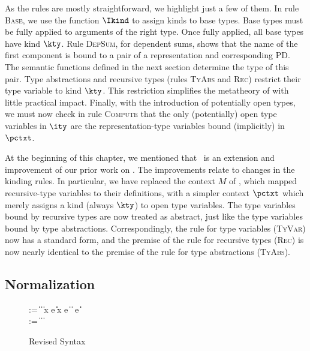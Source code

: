 As the rules are mostly straightforward, we highlight just a few of
them. In rule \textsc{Base}, we use the function $\Ikind$ to assign
kinds to base types.  Base types must be fully applied to arguments of
the right type.  Once fully applied, all base types have kind $\kty$.
Rule \textsc{DepSum}, for dependent sums, shows that the name of the first component is
bound to a pair of a representation and corresponding PD.  The
semantic functions defined in the next section determine the type of
this pair. Type abstractions and recursive types (rules \textsc{TyAbs}
and \textsc{Rec}) restrict their type
variable to kind $\kty$. This restriction simplifies the metatheory
of \ddc with little practical impact.
Finally, with the introduction of potentially open \implang types, we
must now check in rule \textsc{Compute} that the only (potentially)
open type variables in $\ity$ are the representation-type variables
bound (implicitly) in $\pctxt$.

At the beginning of this chapter, we mentioned that \ddc\ is an
extension and improvement of our prior work on \ddcold. The
improvements relate to changes in the kinding rules. In particular, we
have replaced the context $M$ of \ddcold{}, which mapped
recursive-type variables to their definitions, with a simpler context
$\pctxt$ which merely assigns a kind (always $\kty$) to open type
variables.  The type variables bound by recursive types are now
treated as abstract, just like the type variables bound by type
abstractions.  Correspondingly, the rule for type variables
(\textsc{TyVar}) now has a standard form, and the premise of the rule
for recursive types (\textsc{Rec}) is now nearly identical to the
premise of the rule for type abstractions (\textsc{TyAbs}).

\subsection{\ddc{} Normalization}
\label{sec:ddc-norm}

\begin{figure}
\begin{bnf}
   \meta{\tyval} \::= 
    \ptrue\| \pfalse \|  \| \plam{\var}{\ity}{\ty} \|
    \psig x \ty \ty  \nlalt
    \psum \ty e \ty  \| \pand \ty \ty \|
    \pset x \ty e \|
    \pseq \ty {} \nlalt
    \pmu{\ptyvar}{}{\ty}  \| \plam{\ptyvar}{}{\ty} \nlalt
    \pcompute e \ity \| \pabsorb \ty \| \pscan{\ty} 
    \\
   \meta{\ty} \::= \tyval \|  \|
                               \papp{\ty}{\ty} \| \ptyvar
\end{bnf}
  \caption{Revised \ddc{} Syntax}
  \label{fig:revised-ddc-syntax}
\end{figure}

